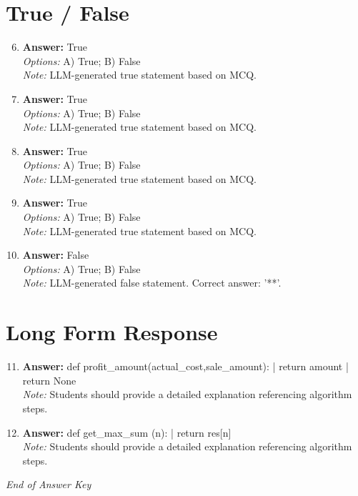 \documentclass[12pt]{article}
\begin{document}
\section*{True / False}
\begin{enumerate}[label=\arabic*.]
\setcounter{enumi}{5}
\item \textbf{Answer:} True
\\ \textit{Options:} A) True; B) False
\\ \textit{Note:} LLM-generated true statement based on MCQ.
\item \textbf{Answer:} True
\\ \textit{Options:} A) True; B) False
\\ \textit{Note:} LLM-generated true statement based on MCQ.
\item \textbf{Answer:} True
\\ \textit{Options:} A) True; B) False
\\ \textit{Note:} LLM-generated true statement based on MCQ.
\item \textbf{Answer:} True
\\ \textit{Options:} A) True; B) False
\\ \textit{Note:} LLM-generated true statement based on MCQ.
\item \textbf{Answer:} False
\\ \textit{Options:} A) True; B) False
\\ \textit{Note:} LLM-generated false statement. Correct answer: '**'.
\end{enumerate}

\section*{Long Form Response}
\begin{enumerate}[label=\arabic*.]
\setcounter{enumi}{10}
\item \textbf{Answer:} def profit\_amount(actual\_cost,sale\_amount): | return amount | return None
\\ \textit{Note:} Students should provide a detailed explanation referencing algorithm steps.
\item \textbf{Answer:} def get\_max\_sum (n): | return res[n]
\\ \textit{Note:} Students should provide a detailed explanation referencing algorithm steps.
\end{enumerate}

\vfill
\noindent\textit{End of Answer Key}
\end{document}
